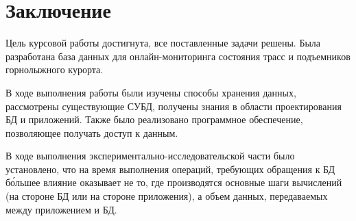 \chapter*{Заключение}


Цель курсовой работы достигнута, все поставленные задачи решены. Была разработана база данных для онлайн-мониторинга состояния трасс и подъемников горнолыжного курорта. 


В ходе выполнения работы были изучены способы хранения данных, рассмотрены существующие СУБД, получены знания в области проектирования БД и приложений. Также было реализовано программное обеспечение, позволяющее получать доступ к данным.

В ходе выполнения экспериментально-исследовательской части было установлено, что на время выполнения операций, требующих обращения к БД б\'{о}льшее влияние оказывает не то, где производятся основные шаги вычислений (на стороне БД или на стороне приложения), а объем данных, передаваемых между приложением и БД.




